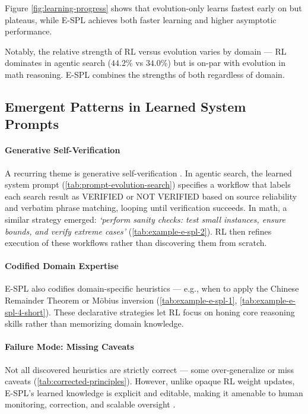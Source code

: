 \documentclass{article}
\theoremstyle{plain}
\theoremstyle{definition}
\theoremstyle{remark}
\begin{document}
Figure \ref{fig:learning-progress} shows that evolution-only learns fastest early on but plateaus, while E-SPL achieves both faster learning and higher asymptotic performance.

Notably, the relative strength of RL versus evolution varies by domain --- RL dominates in agentic search ($44.2\%$ vs $34.0\%$) but is on-par with evolution in math reasoning. E-SPL combines the strengths of both regardless of domain.

\vspace{-5pt}
\subsection{Emergent Patterns in Learned System Prompts}

\paragraph{Generative Self-Verification} A recurring theme is generative self-verification \citep{gen-verifier}. In agentic search, the learned system prompt (\autoref{tab:prompt-evolution-search}) specifies a workflow that labels each search result as VERIFIED or NOT VERIFIED based on source reliability and verbatim phrase matching, looping until verification succeeds. In math, a similar strategy emerged: \emph{`perform sanity checks: test small instances, ensure bounds, and verify extreme cases'} (\autoref{tab:example-e-spl-2}). RL then refines execution of these workflows rather than discovering them from scratch.

\vspace{-6pt}
\paragraph{Codified Domain Expertise} E-SPL also codifies domain-specific heuristics — e.g., when to apply the Chinese Remainder Theorem or Möbius inversion (\autoref{tab:example-e-spl-1}, \autoref{tab:example-e-spl-4-short}). These declarative strategies let RL focus on honing core reasoning skills rather than memorizing domain knowledge.

\vspace{-6pt}
\paragraph{Failure Mode: Missing Caveats} Not all discovered heuristics are strictly correct — some over-generalize or miss caveats (\autoref{tab:corrected-principles}). However, unlike opaque RL weight updates, E-SPL's learned knowledge is explicit and editable, making it amenable to human monitoring, correction, and scalable oversight \citep{scalable-agent-alignment, scalable-oversight}.
\end{document}
